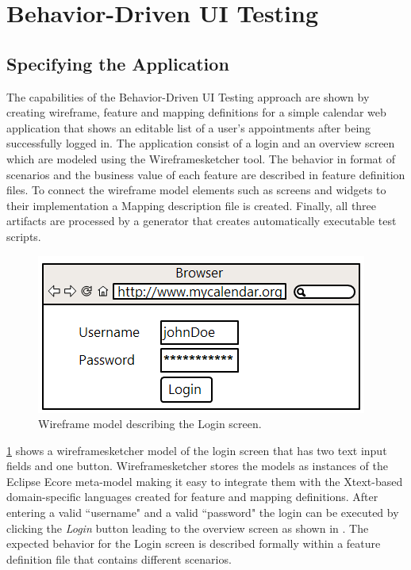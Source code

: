 \documentclass{sig-alternate-05-2015}
\begin{document}
\section{Behavior-Driven UI Testing}\label{sec:BehaviorDrivenUITesting}
\subsection{Specifying the Application}\label{sec:SpecifyingTheApplication} 
The capabilities of the Behavior-Driven UI Testing approach are shown by creating wireframe, feature and mapping definitions for a simple calendar web application that shows an editable list of a user's appointments after being successfully logged in.
The application consist of a login and an overview screen which are modeled using the Wireframesketcher tool.
The behavior in format of scenarios and the business value of each feature are described in feature definition files.
To connect the wireframe model elements such as screens and widgets to their implementation a Mapping description file is created.
Finally, all three artifacts are processed by a generator that creates automatically executable test scripts.

\begin{figure}[h]
	\centering
	\includegraphics[width=0.8\linewidth]{Login.png}
	\caption{Wireframe model describing the Login screen.}
	\label{fig:login}
\end{figure}

\cref{fig:login} shows a wireframesketcher model of the login screen that has two text input fields and one button.
Wireframesketcher stores the models as instances of the Eclipse Ecore meta-model \cite{SBPM09} making it easy to integrate them with the Xtext-based domain-specific languages created for feature and mapping definitions.
After entering a valid ``username" and a valid ``password" the login can be executed by clicking the \textit{Login} button leading to the overview screen as shown in .
The expected behavior for the Login screen is described formally within a feature definition file that contains different scenarios.
\end{document}
